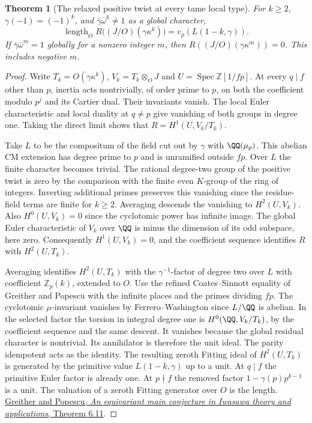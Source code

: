 \documentclass[a4paper,11pt]{article}
\newtheorem{theorem}[proposition]{Theorem}
\theoremstyle{definition}
\theoremstyle{remark}
\newcommand{\ZZ}{\mathbb Z}\newcommand{\ord}{\operatorname{ord}}
\numberwithin{equation}{section}
\begin{document}
\begin{theorem}[The relaxed positive twist at every tame local type]\leavevmode
\label{thm:criticalall310}
For \(k\ge2\), \(\gamma(-1)=(-1)^k\), and
\(\bar\gamma\bar\omega^k\ne1\) as a global character,
\[
    \operatorname{length}_O R\big((J/O)(\gamma\kappa^k)\big)
                  =v_p(L(1-k,\gamma)).
\]
If \(\bar\gamma\bar\omega^m=1\) globally for a nonzero integer
\(m\), then \(R((J/O)(\gamma\kappa^m))=0\). This includes
negative \(m\).
\end{theorem}
\begin{proof}
Write \(T_k=O(\gamma\kappa^k)\), \(V_k=T_k\otimes_O J\) and
\(U=\operatorname{Spec}\ZZ[1/fp]\). At every \(q\mid f\)
other than \(p\), inertia acts nontrivially, of order prime to
\(p\), on both the coefficient modulo \(p^j\) and its Cartier
dual. Their invariants vanish. The local Euler characteristic
and local duality at \(q\ne p\) give vanishing of both groups
in degree one. Taking the direct limit shows that \(R=H^1(U,V_k/T_k)\).

Take \(L\) to be the compositum of the field cut out by \(\gamma\) with
\(\QQ(\mu_p)\). This abelian CM extension has degree prime to \(p\)
and is unramified outside \(fp\). Over \(L\) the finite character
becomes trivial. The rational degree-two group of the positive
twist is zero by the comparison with the finite even \(K\)-group
of the ring of integers. Inverting additional primes preserves
this vanishing since the residue-field terms are finite for
\(k\ge2\). Averaging descends the vanishing to \(H^2(U,V_k)\).
Also \(H^0(U,V_k)=0\) since the cyclotomic power has infinite
image. The global Euler characteristic of \(V_k\) over \(\QQ\)
is minus the dimension of its odd subspace, here zero.
Consequently \(H^1(U,V_k)=0\), and the coefficient sequence
identifies \(R\) with \(H^2(U,T_k)\).

Averaging identifies \(H^2(U,T_k)\) with the
\(\gamma^{-1}\)-factor of degree two over \(L\) with coefficient
\(\ZZ_p(k)\), extended to \(O\). Use the refined Coates--Sinnott
equality of Greither and Popescu with the infinite places and
the primes dividing \(fp\). The cyclotomic \(\mu\)-invariant
vanishes by Ferrero--Washington since \(L/\QQ\) is abelian.
In the selected factor the torsion in integral degree one is
\(H^0(\QQ,V_k/T_k)\), by the coefficient sequence and the same
descent. It vanishes because the global residual character is
nontrivial. Its annihilator is therefore the unit ideal.
The parity idempotent acts as the identity. The resulting
zeroth Fitting ideal of \(H^2(U,T_k)\) is generated by the
primitive value \(L(1-k,\gamma)\) up to a unit. At \(q\mid f\)
the primitive Euler factor is already one. At \(p\nmid f\) the
removed factor \(1-\gamma(p)p^{k-1}\) is a unit. The valuation
of a zeroth Fitting generator over \(O\) is the length.
\href{https://arxiv.org/pdf/1103.3069}{Greither and Popescu,
\emph{An equivariant main conjecture in Iwasawa theory and applications},
Theorem 6.11}.


\end{proof}
\end{document}
